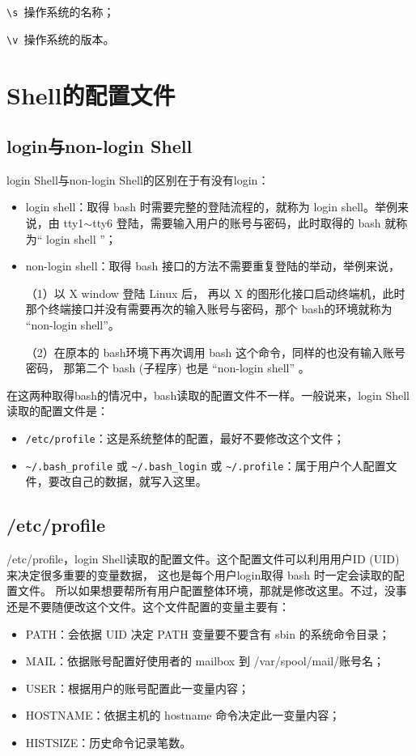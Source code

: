 \verb|\s |操作系统的名称；

\verb|\v |操作系统的版本。




\section{Shell的配置文件}
\subsection{login与non-login Shell}
login Shell与non-login Shell的区别在于有没有login：
\begin{itemize}
\item login shell：取得 bash 时需要完整的登陆流程的，就称为 login shell。举例来说，由 tty1$\sim$tty6 登陆，需要输入用户的账号与密码，此时取得的 bash 就称为“ login shell ”；

\item non-login shell：取得 bash 接口的方法不需要重复登陆的举动，举例来说，

\qquad（1）以 X window 登陆 Linux 后， 再以 X 的图形化接口启动终端机，此时那个终端接口并没有需要再次的输入账号与密码，那个 bash的环境就称为 “non-login shell”。

\qquad （2）在原本的 bash环境下再次调用 bash 这个命令，同样的也没有输入账号密码， 那第二个 bash (子程序) 也是 “non-login shell” 。
\end{itemize}

在这两种取得bash的情况中，bash读取的配置文件不一样。一般说来，login Shell读取的配置文件是：
\begin{itemize}
\item \verb|/etc/profile|：这是系统整体的配置，最好不要修改这个文件；

\item \verb|~/.bash_profile| 或 \verb|~/.bash_login| 或 \verb|~/.profile|：属于用户个人配置文件，要改自己的数据，就写入这里。
\end{itemize}


\subsection{/etc/profile}
/etc/profile，login Shell读取的配置文件。这个配置文件可以利用用户ID (UID) 来决定很多重要的变量数据， 这也是每个用户login取得 bash 时一定会读取的配置文件。 所以如果想要帮所有用户配置整体环境，那就是修改这里。不过，没事还是不要随便改这个文件。这个文件配置的变量主要有：
\begin{itemize}
\item PATH：会依据 UID 决定 PATH 变量要不要含有 sbin 的系统命令目录；
\item MAIL：依据账号配置好使用者的 mailbox 到 /var/spool/mail/账号名；
\item USER：根据用户的账号配置此一变量内容；
\item HOSTNAME：依据主机的 hostname 命令决定此一变量内容；
\item HISTSIZE：历史命令记录笔数。
\end{itemize}

